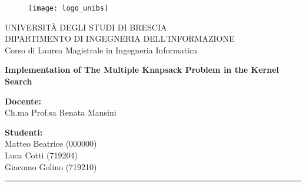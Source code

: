 \begin{titlepage}
    \begin{figure}[H] %
        \centering
        \texttt{[image: logo\_unibs]}
    \end{figure}

    \begin{center}
        \LARGE{\uppercase{Università degli Studi di Brescia}}\\ %
        \vspace{5mm} %
        \large{\uppercase{Dipartimento di Ingegneria dell'informazione}}\\
        \vspace{5mm}
        \large{Corso di Laurea Magistrale in Ingegneria Informatica}\\
    \end{center}

    \vspace{15mm}

    \begin{center}
        \LARGE{\textbf{Implementation of The Multiple Knapsack Problem in the Kernel Search}}\\
    \end{center}

    \vspace{10mm}

    \begin{flushleft}
        \large
        \textbf{Docente:}\\
        Ch.ma Prof.sa Renata Mansini
    \end{flushleft}

    \begin{flushright}
        \large
        \textbf{Studenti:}\\
        Matteo Beatrice (000000)\\
        Luca Cotti (719204)\\
        Giacomo Golino (719210)
    \end{flushright}

    \vspace*{\fill} %

    \rule{0.8\textwidth}{0.6pt}\\ %
\end{titlepage}